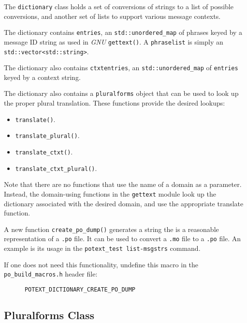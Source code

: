    The \texttt{dictionary} class holds a set of conversions of strings to a
   list of possible conversions, and another set of lists to support various
   message contexts.

   The dictionary contains \texttt{entries}, an \texttt{std::unordered\_map}
   of phrases keyed by a message ID string as used in \textsl{GNU}
   \texttt{gettext()}.
   A \texttt{phraselist} is simply an \texttt{std::vector<std::string>}.

   The dictionary also contains \texttt{ctxtentries},
   an \texttt{std::unordered\_map} of \texttt{entries} keyed by a
   context string.

   The dictionary also contains a \texttt{pluralforms} object that can be used
   to look up the proper plural translation.
   These functions provide the desired lookups:

   \begin{itemize}
      \item \texttt{translate()}. 
      \item \texttt{translate\_plural()}. 
      \item \texttt{translate\_ctxt()}. 
      \item \texttt{translate\_ctxt\_plural()}. 
   \end{itemize}

   Note that there are no functions that use the name of a domain as
   a parameter.
   Instead, the domain-using functions in the \texttt{gettext} module
   look up the dictionary associated with the desired domain, 
   and use the appropriate translate function.

   A new function \texttt{create\_po\_dump()} generates a string
   the is a reasonable representation of a \texttt{.po} file.
   It can be used to convert a \texttt{.mo} file to a \texttt{.po}
   file. An example is its usage in the \texttt{potext\_test list-msgstrs}
   command.

   If one does not need this functionality, undefine this macro in
   the \texttt{po\_build\_macros.h} header file:

   \begin{verbatim}
      POTEXT_DICTIONARY_CREATE_PO_DUMP
   \end{verbatim}

\subsection{Pluralforms Class}
\label{subsec:potext_pluralforms_class}

